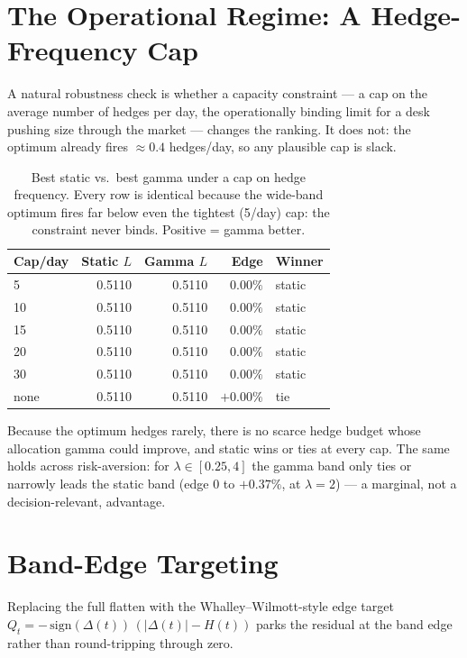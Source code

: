 \documentclass[11pt]{article}
\begin{document}
\section{The Operational Regime: A Hedge-Frequency Cap}

A natural robustness check is whether a capacity constraint --- a cap on the average number of
hedges per day, the operationally binding limit for a desk pushing size through the market ---
changes the ranking. It does not: the optimum already fires $\approx0.4$ hedges/day, so any
plausible cap is slack.

\begin{table}[htbp]
\centering
\small
\begin{tabular}{lrrrl}
\toprule
\textbf{Cap/day} & \textbf{Static $L$} & \textbf{Gamma $L$} & \textbf{Edge} & \textbf{Winner} \\
\midrule
5    & 0.5110 & 0.5110 & $0.00\%$ & static \\
10   & 0.5110 & 0.5110 & $0.00\%$ & static \\
15   & 0.5110 & 0.5110 & $0.00\%$ & static \\
20   & 0.5110 & 0.5110 & $0.00\%$ & static \\
30   & 0.5110 & 0.5110 & $0.00\%$ & static \\
\midrule
none & 0.5110 & 0.5110 & $+0.00\%$ & tie \\
\bottomrule
\end{tabular}
\caption{Best static vs.\ best gamma under a cap on hedge frequency. Every row is identical
because the wide-band optimum fires far below even the tightest (5/day) cap: the constraint
never binds. Positive = gamma better.}
\end{table}

Because the optimum hedges rarely, there is no scarce hedge budget whose allocation gamma
could improve, and static wins or ties at every cap. The same holds across risk-aversion:
for $\lambda \in [0.25, 4]$ the gamma band only ties or narrowly leads the static band (edge
$0$ to $+0.37\%$, at $\lambda = 2$) --- a marginal, not a decision-relevant, advantage.

\section{Band-Edge Targeting}

Replacing the full flatten with the Whalley--Wilmott-style edge target
$Q_t = -\,\mathrm{sign}(\Delta(t))\,(\lvert\Delta(t)\rvert - H(t))$ parks the residual at
the band edge rather than round-tripping through zero.
\end{document}
